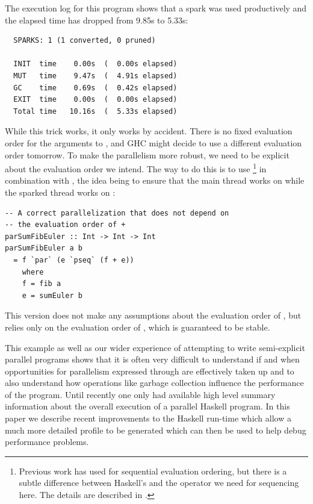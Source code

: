 The execution log for this program shows that a spark was used productively and the elapsed time has dropped from 9.85s to 5.33s:

\begin{verbatim}
  SPARKS: 1 (1 converted, 0 pruned)

  INIT  time    0.00s  (  0.00s elapsed)
  MUT   time    9.47s  (  4.91s elapsed)
  GC    time    0.69s  (  0.42s elapsed)
  EXIT  time    0.00s  (  0.00s elapsed)
  Total time   10.16s  (  5.33s elapsed)
\end{verbatim}

While this trick works, it only works by accident.  There is no fixed
evaluation order for the arguments to \codef{+}, and GHC might decide
to use a different evaluation order tomorrow.  To make the parallelism
more robust, we need to be explicit about the evaluation order we
intend.  The way to do this is to use \footnote{Previous
  work has used  for sequential evaluation ordering, but
  there is a subtle difference between Haskell's  and the
  operator we need for sequencing here.  The details are described in
  \citet{multicore-ghc}.} in combination with
, the idea being to ensure that the main thread works on
 while the sparked thread works on :

\begin{lstlisting}
-- A correct parallelization that does not depend on
-- the evaluation order of +
parSumFibEuler :: Int -> Int -> Int
parSumFibEuler a b
  = f `par` (e `pseq` (f + e))
    where
    f = fib a
    e = sumEuler b
\end{lstlisting}

This version does not make any assumptions about the evaluation order
of \codef{+}, but relies only on the evaluation order of ,
which is guaranteed to be stable.

This example as well as our wider experience of attempting to write semi-explicit parallel programs shows that it is often very difficult to understand if and when opportunities for parallelism expressed through  are effectively taken up and to also understand how operations like garbage collection influence the performance of the program. Until recently one only had available high level summary information about the overall execution of a parallel Haskell program. In this paper we describe recent improvements to the Haskell run-time which allow a much more detailed profile to be generated which can then be used to help debug performance problems.

